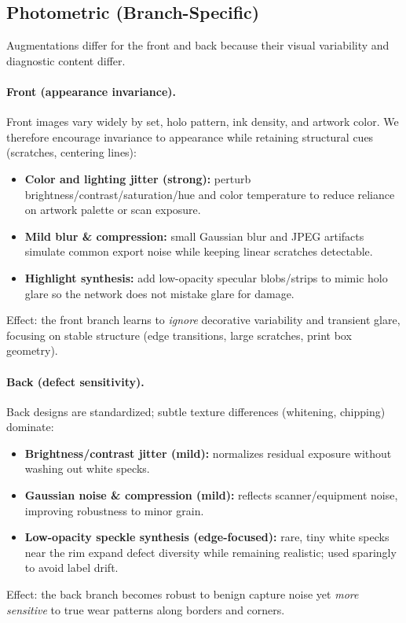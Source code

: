 \documentclass[12pt]{article}
\begin{document}
\subsection{Photometric (Branch-Specific)}
\label{subsec:aug-photo}
Augmentations differ for the front and back because their visual variability and diagnostic content differ.

\paragraph{Front (appearance invariance).}
Front images vary widely by set, holo pattern, ink density, and artwork color. 
We therefore encourage invariance to appearance while retaining structural cues (scratches, centering lines):
\begin{itemize}
  \item \textbf{Color and lighting jitter (strong):} perturb brightness/contrast/saturation/hue and color temperature to reduce reliance on artwork palette or scan exposure.
  \item \textbf{Mild blur \& compression:} small Gaussian blur and JPEG artifacts simulate common export noise while keeping linear scratches detectable.
  \item \textbf{Highlight synthesis:} add low-opacity specular blobs/strips to mimic holo glare so the network does not mistake glare for damage.
\end{itemize}
Effect: the front branch learns to \emph{ignore} decorative variability and transient glare, focusing on stable structure (edge transitions, large scratches, print box geometry).

\paragraph{Back (defect sensitivity).}
Back designs are standardized; subtle texture differences (whitening, chipping) dominate:
\begin{itemize}
  \item \textbf{Brightness/contrast jitter (mild):} normalizes residual exposure without washing out white specks.
  \item \textbf{Gaussian noise \& compression (mild):} reflects scanner/equipment noise, improving robustness to minor grain.
  \item \textbf{Low-opacity speckle synthesis (edge-focused):} rare, tiny white specks near the rim expand defect diversity while remaining realistic; used sparingly to avoid label drift.
\end{itemize}
Effect: the back branch becomes robust to benign capture noise yet \emph{more sensitive} to true wear patterns along borders and corners.
\end{document}
